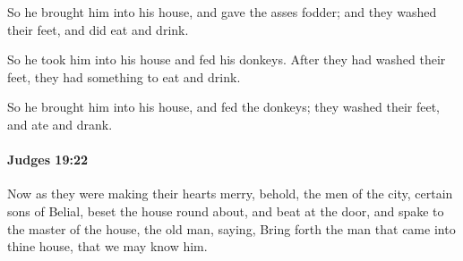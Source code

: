 			\begin{versebox}
					\item[BHS] 
					\item[ASV] So he brought him into his house, and gave the asses fodder; and they washed their feet, and did eat and drink.
					\item[NIV] So he took him into his house and fed his donkeys. After they had washed their feet, they had something to eat and drink.
					\item[NRSV] So he brought him into his house, and fed the donkeys; they washed their feet, and ate and drank.
			\end{versebox}

		\paragraph{Judges 19:22} %
			\label{JUDGES-19-22}

			Now as they were making their hearts merry, behold, the men of the city, certain sons of Belial, beset the house round about, and beat at the door, and spake to the master of the house, the old man, saying, Bring forth the man that came into thine house, that we may know him.

